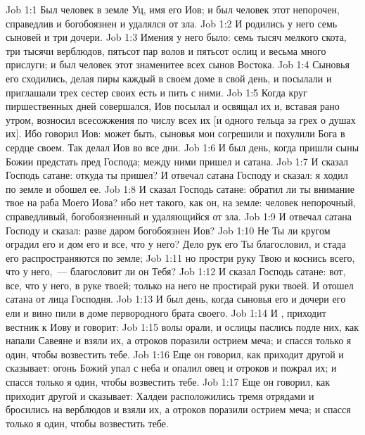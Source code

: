\vs Job 1:1 Был человек в земле Уц, имя его Иов; и был человек этот непорочен, справедлив и богобоязнен и удалялся от зла.
\vs Job 1:2 И родились у него семь сыновей и три дочери.
\vs Job 1:3 Имения у него было: семь тысяч мелкого скота, три тысячи верблюдов, пятьсот пар волов и пятьсот ослиц и весьма много прислуги; и был человек этот знаменитее всех сынов Востока.
\vs Job 1:4 Сыновья его сходились, делая пиры каждый в своем доме в свой день, и посылали и приглашали трех сестер своих есть и пить с ними.
\vs Job 1:5 Когда круг пиршественных дней совершался, Иов посылал  и освящал их и, вставая рано утром, возносил всесожжения по числу всех их [и одного тельца за грех о душах их]. Ибо говорил Иов: может быть, сыновья мои согрешили и похулили Бога в сердце своем. Так делал Иов во все  дни.
\rsbpar\vs Job 1:6 И был день, когда пришли сыны Божии предстать пред Господа; между ними пришел и сатана.
\vs Job 1:7 И сказал Господь сатане: откуда ты пришел? И отвечал сатана Господу и сказал: я ходил по земле и обошел ее.
\vs Job 1:8 И сказал Господь сатане: обратил ли ты внимание твое на раба Моего Иова? ибо нет такого, как он, на земле: человек непорочный, справедливый, богобоязненный и удаляющийся от зла.
\vs Job 1:9 И отвечал сатана Господу и сказал: разве даром богобоязнен Иов?
\vs Job 1:10 Не Ты ли кругом оградил его и дом его и все, что у него? Дело рук его Ты благословил, и стада его распространяются по земле;
\vs Job 1:11 но простри руку Твою и коснись всего, что у него,~--- благословит ли он Тебя?
\vs Job 1:12 И сказал Господь сатане: вот, все, что у него, в руке твоей; только на него не простирай руки твоей. И отошел сатана от лица Господня.
\rsbpar\vs Job 1:13 И был день, когда сыновья его и дочери его ели и вино пили в доме первородного брата своего.
\vs Job 1:14 И , приходит вестник к Иову и говорит:
\vs Job 1:15 волы орали, и ослицы паслись подле них, как напали Савеяне и взяли их, а отроков поразили острием меча; и спасся только я один, чтобы возвестить тебе.
\vs Job 1:16 Еще он говорил, как приходит другой и сказывает: огонь Божий упал с неба и опалил овец и отроков и пожрал их; и спасся только я один, чтобы возвестить тебе.
\vs Job 1:17 Еще он говорил, как приходит другой и сказывает: Халдеи расположились тремя отрядами и бросились на верблюдов и взяли их, а отроков поразили острием меча; и спасся только я один, чтобы возвестить тебе.
